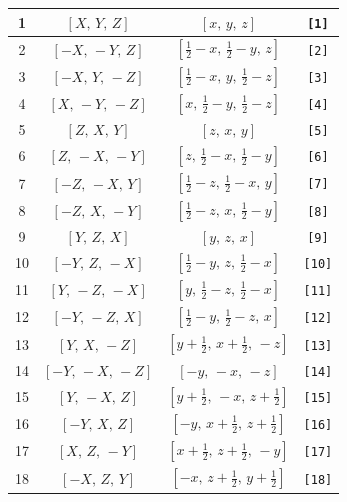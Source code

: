 \documentclass[fleqn,8pt]{jsarticle}
\begin{document}
\begin{longtable}{cccc}
1 & $\left[ X,\, Y,\, Z \right]$ & $\left[ x,\, y,\, z \right]$ & {\tt [1]} \\ \hline
2 & $\left[ - X,\, - Y,\, Z \right]$ & $\left[ \frac{1}{2} - x,\, \frac{1}{2} - y,\, z \right]$ & {\tt [2]} \\ \hline
3 & $\left[ - X,\, Y,\, - Z \right]$ & $\left[ \frac{1}{2} - x,\, y,\, \frac{1}{2} - z \right]$ & {\tt [3]} \\ \hline
4 & $\left[ X,\, - Y,\, - Z \right]$ & $\left[ x,\, \frac{1}{2} - y,\, \frac{1}{2} - z \right]$ & {\tt [4]} \\ \hline
5 & $\left[ Z,\, X,\, Y \right]$ & $\left[ z,\, x,\, y \right]$ & {\tt [5]} \\ \hline
6 & $\left[ Z,\, - X,\, - Y \right]$ & $\left[ z,\, \frac{1}{2} - x,\, \frac{1}{2} - y \right]$ & {\tt [6]} \\ \hline
7 & $\left[ - Z,\, - X,\, Y \right]$ & $\left[ \frac{1}{2} - z,\, \frac{1}{2} - x,\, y \right]$ & {\tt [7]} \\ \hline
8 & $\left[ - Z,\, X,\, - Y \right]$ & $\left[ \frac{1}{2} - z,\, x,\, \frac{1}{2} - y \right]$ & {\tt [8]} \\ \hline
9 & $\left[ Y,\, Z,\, X \right]$ & $\left[ y,\, z,\, x \right]$ & {\tt [9]} \\ \hline
10 & $\left[ - Y,\, Z,\, - X \right]$ & $\left[ \frac{1}{2} - y,\, z,\, \frac{1}{2} - x \right]$ & {\tt [10]} \\ \hline
11 & $\left[ Y,\, - Z,\, - X \right]$ & $\left[ y,\, \frac{1}{2} - z,\, \frac{1}{2} - x \right]$ & {\tt [11]} \\ \hline
12 & $\left[ - Y,\, - Z,\, X \right]$ & $\left[ \frac{1}{2} - y,\, \frac{1}{2} - z,\, x \right]$ & {\tt [12]} \\ \hline
13 & $\left[ Y,\, X,\, - Z \right]$ & $\left[ y + \frac{1}{2},\, x + \frac{1}{2},\, - z \right]$ & {\tt [13]} \\ \hline
14 & $\left[ - Y,\, - X,\, - Z \right]$ & $\left[ - y,\, - x,\, - z \right]$ & {\tt [14]} \\ \hline
15 & $\left[ Y,\, - X,\, Z \right]$ & $\left[ y + \frac{1}{2},\, - x,\, z + \frac{1}{2} \right]$ & {\tt [15]} \\ \hline
16 & $\left[ - Y,\, X,\, Z \right]$ & $\left[ - y,\, x + \frac{1}{2},\, z + \frac{1}{2} \right]$ & {\tt [16]} \\ \hline
17 & $\left[ X,\, Z,\, - Y \right]$ & $\left[ x + \frac{1}{2},\, z + \frac{1}{2},\, - y \right]$ & {\tt [17]} \\ \hline
18 & $\left[ - X,\, Z,\, Y \right]$ & $\left[ - x,\, z + \frac{1}{2},\, y + \frac{1}{2} \right]$ & {\tt [18]} \\ \hline

\end{longtable}
\end{document}
